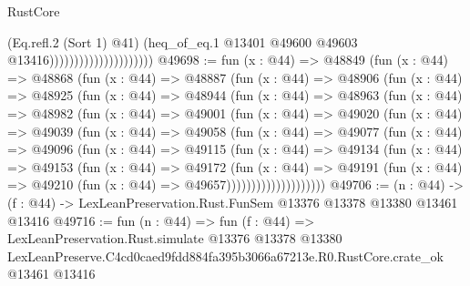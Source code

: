 \begin{lexlean}{RustCore}
\begin{coremodule}
                                            (Eq.refl.{2} (Sort 1) @41)
                                            (heq_of_eq.{1}
                                              @13401
                                              @49600
                                              @49603
                                              @13416)))))))))))))))))))))
@49698 := fun (x : @44) =>
  @48849
    (fun (x : @44) =>
    @48868
      (fun (x : @44) =>
      @48887
        (fun (x : @44) =>
        @48906
          (fun (x : @44) =>
          @48925
            (fun (x : @44) =>
            @48944
              (fun (x : @44) =>
              @48963
                (fun (x : @44) =>
                @48982
                  (fun (x : @44) =>
                  @49001
                    (fun (x : @44) =>
                    @49020
                      (fun (x : @44) =>
                      @49039
                        (fun (x : @44) =>
                        @49058
                          (fun (x : @44) =>
                          @49077
                            (fun (x : @44) =>
                            @49096
                              (fun (x : @44) =>
                              @49115
                                (fun (x : @44) =>
                                @49134
                                  (fun (x : @44) =>
                                  @49153
                                    (fun (x : @44) =>
                                    @49172
                                      (fun (x : @44) =>
                                      @49191
                                        (fun (x : @44) =>
                                        @49210 (fun (x : @44) => @49657))))))))))))))))))))
@49706 := (n : @44) ->
  (f : @44) -> LexLeanPreservation.Rust.FunSem @13376 @13378 @13380 @13461 @13416
@49716 := fun (n : @44) =>
  fun (f : @44) =>
  LexLeanPreservation.Rust.simulate
    @13376
    @13378
    @13380
    LexLeanPreserve.C4cd0caed9fdd884fa395b3066a67213e.R0.RustCore.crate_ok
    @13461
    @13416
\end{coremodule}
\end{lexlean}
